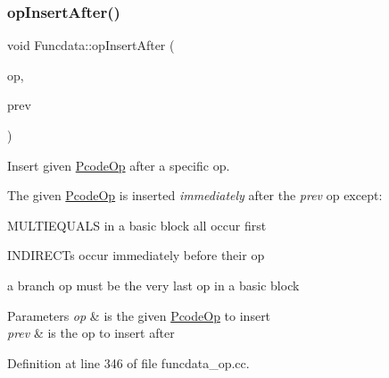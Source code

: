\subsubsection{\texorpdfstring{opInsertAfter()}{opInsertAfter()}}
{\footnotesize\ttfamily void Funcdata\+::op\+Insert\+After (\begin{DoxyParamCaption}\item[{\mbox{\hyperlink{class_pcode_op}{Pcode\+Op}} $\ast$}]{op,  }\item[{\mbox{\hyperlink{class_pcode_op}{Pcode\+Op}} $\ast$}]{prev }\end{DoxyParamCaption})}



Insert given \mbox{\hyperlink{class_pcode_op}{Pcode\+Op}} after a specific op. 

The given \mbox{\hyperlink{class_pcode_op}{Pcode\+Op}} is inserted {\itshape immediately} after the {\itshape prev} op except\+:
\begin{DoxyItemize}
\item M\+U\+L\+T\+I\+E\+Q\+U\+A\+LS in a basic block all occur first
\item I\+N\+D\+I\+R\+E\+C\+Ts occur immediately before their op
\item a branch op must be the very last op in a basic block
\end{DoxyItemize}


\begin{DoxyParams}{Parameters}
{\em op} & is the given \mbox{\hyperlink{class_pcode_op}{Pcode\+Op}} to insert \\
\hline
{\em prev} & is the op to insert after \\
\hline
\end{DoxyParams}


Definition at line 346 of file funcdata\+\_\+op.\+cc.

